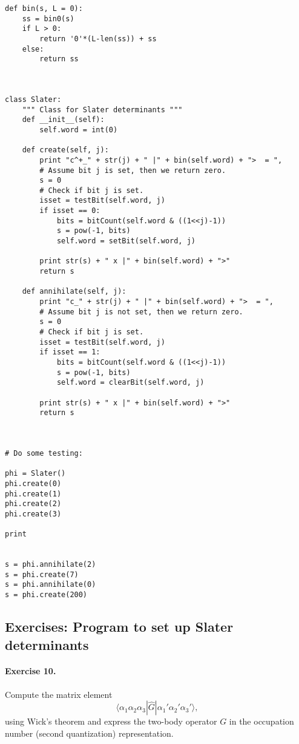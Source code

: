 \documentclass[%
twoside,                 %
final,                   %
10pt]{article}
\begin{document}
\begin{verbatim}
def bin(s, L = 0):
    ss = bin0(s)
    if L > 0:
        return '0'*(L-len(ss)) + ss
    else:
        return ss
    
    

class Slater:
    """ Class for Slater determinants """
    def __init__(self):
        self.word = int(0)

    def create(self, j):
        print "c^+_" + str(j) + " |" + bin(self.word) + ">  = ",
        # Assume bit j is set, then we return zero.
        s = 0
        # Check if bit j is set.
        isset = testBit(self.word, j)
        if isset == 0:
            bits = bitCount(self.word & ((1<<j)-1))
            s = pow(-1, bits)
            self.word = setBit(self.word, j)

        print str(s) + " x |" + bin(self.word) + ">"
        return s
        
    def annihilate(self, j):
        print "c_" + str(j) + " |" + bin(self.word) + ">  = ",
        # Assume bit j is not set, then we return zero.
        s = 0
        # Check if bit j is set.
        isset = testBit(self.word, j)
        if isset == 1:
            bits = bitCount(self.word & ((1<<j)-1))
            s = pow(-1, bits)
            self.word = clearBit(self.word, j)

        print str(s) + " x |" + bin(self.word) + ">"
        return s



# Do some testing:

phi = Slater()
phi.create(0)
phi.create(1)
phi.create(2)
phi.create(3)

print


s = phi.annihilate(2)
s = phi.create(7)
s = phi.annihilate(0)
s = phi.create(200)

\end{verbatim}

    


\subsection*{Exercises: Program to set up Slater determinants}

\paragraph{Exercise 10.}
Compute the matrix element
\[
\langle\alpha_{1}\alpha_{2}\alpha_{3}|\hat{G}|\alpha_{1}'\alpha_{2}'\alpha_{3}'\rangle,
\]
using Wick's theorem and express the two-body operator
$G$ in the occupation number (second quantization) 
representation.
\end{document}
